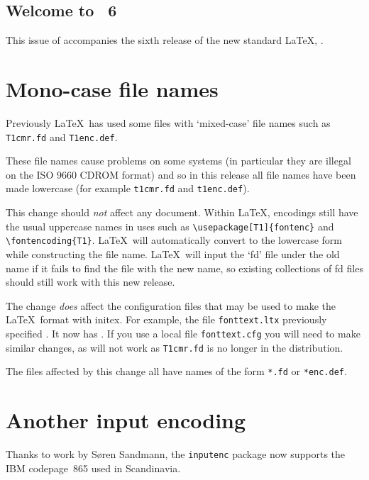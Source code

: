 \documentclass{ltnews}
\providecommand\pkg[1]{\texttt{#1}}
\providecommand\file[1]{\texttt{#1}}
\begin{document}
\maketitle

\subsection{Welcome to \LaTeXNews~6}
This issue of \emph{\LaTeXNews} accompanies the sixth release of the
new standard \LaTeX{}, \LaTeXe.

\section{Mono-case file names}
Previously \LaTeX\ has used some files with `mixed-case' file names
such as \file{T1cmr.fd} and \file{T1enc.def}.

These file names cause problems on some systems (in particular they
are illegal on the ISO 9660 CDROM format) and so in this release
all file names have been made lowercase (for example
\file{t1cmr.fd} and \file{t1enc.def}).

This change should \emph{not} affect any document. Within \LaTeX,
encodings still have the usual uppercase names in uses such as
\verb|\usepackage[T1]{fontenc}| and \verb|\fontencoding{T1}|.
\LaTeX\ will automatically convert to the lowercase form while
constructing the file name.
\LaTeX\ will input the `fd' file under the old name if it fails to
find the file with the new name, so existing collections of fd files
should still work with this new release.

The change \emph{does} affect the configuration files that may be used
to make the \LaTeX\ format with initex. For example, the file
\file{fonttext.ltx} previously specified \verb||.
It now has \verb||.
If you use a local file \file{fonttext.cfg}
you will need to make similar changes, as \verb||
will not work as \file{T1cmr.fd} is no longer in the distribution.

The files affected by this change all have names of the form
\verb|*.fd| or \verb|*enc.def|.

\section{Another input encoding}
Thanks to work by S\o ren Sandmann, the \pkg{inputenc} package now
supports the IBM codepage~865 used in Scandinavia.
\end{document}
